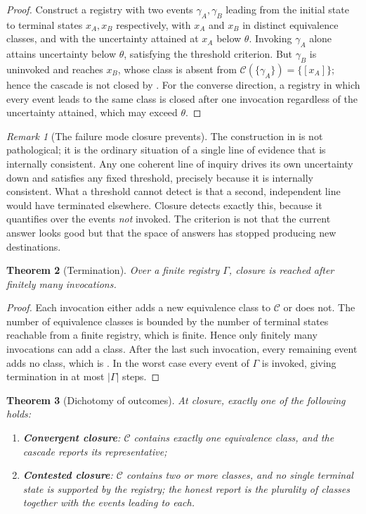 \documentclass[11pt,a4paper]{article}
\theoremstyle{thmstyle}
\newtheorem{theorem}{Theorem}[section]
\theoremstyle{definition}
\theoremstyle{remark}
\newtheorem{remark}[theorem]{Remark}
\newcommand{\abs}[1]{\lvert#1\rvert}
\begin{document}
\begin{proof}
Construct a registry with two events $\gamma_A,\gamma_B$ leading from the
initial state to terminal states $x_A,x_B$ respectively, with $x_A$ and
$x_B$ in distinct equivalence classes, and with the uncertainty attained at
$x_A$ below $\theta$. Invoking $\gamma_A$ alone attains uncertainty below
$\theta$, satisfying the threshold criterion. But $\gamma_B$ is uninvoked
and reaches $x_B$, whose class is absent from
$\mathcal{C}(\{\gamma_A\})=\{[x_A]\}$; hence the cascade is not closed by
. For the converse direction, a registry in which every
event leads to the same class is closed after one invocation regardless of
the uncertainty attained, which may exceed $\theta$.
\end{proof}

\begin{remark}[The failure mode closure prevents]
\label{rem:closure-why}
The construction in  is not pathological; it is
the ordinary situation of a single line of evidence that is internally
consistent. Any one coherent line of inquiry drives its own uncertainty down
and satisfies any fixed threshold, precisely because it is internally
consistent. What a threshold cannot detect is that a second, independent
line would have terminated elsewhere. Closure detects exactly this, because
it quantifies over the events \emph{not} invoked. The criterion is not that
the current answer looks good but that the space of answers has stopped
producing new destinations.
\end{remark}

\begin{theorem}[Termination]
\label{thm:termination}
Over a finite registry $\Gamma$, closure is reached after finitely many
invocations.
\end{theorem}

\begin{proof}
Each invocation either adds a new equivalence class to $\mathcal{C}$ or does
not. The number of equivalence classes is bounded by the number of terminal
states reachable from a finite registry, which is finite. Hence only
finitely many invocations can add a class. After the last such invocation,
every remaining event adds no class, which is . In the
worst case every event of $\Gamma$ is invoked, giving termination in at most
$\abs{\Gamma}$ steps.
\end{proof}

\begin{theorem}[Dichotomy of outcomes]
\label{thm:dichotomy}
At closure, exactly one of the following holds:
\begin{enumerate}[label=\textup{(\roman*)},leftmargin=2.2em]
\item \textbf{Convergent closure}: $\mathcal{C}$ contains exactly one
equivalence class, and the cascade reports its representative;
\item \textbf{Contested closure}: $\mathcal{C}$ contains two or more
classes, and no single terminal state is supported by the registry; the
honest report is the plurality of classes together with the events leading
to each.
\end{enumerate}
\end{theorem}
\end{document}
